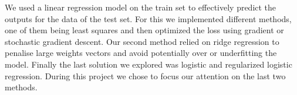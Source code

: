 \documentclass[10pt,conference,compsocconf]{IEEEtran}
\begin{document}
We used a linear regression model on the train set to effectively 
predict the outputs for the data of the test set. For this we implemented 
different methods, one of them being least squares and then optimized the 
loss using gradient or stochastic gradient descent.
Our second method relied on ridge regression to penalise large weights 
vectors and avoid potentially over or underfitting the model.
Finally the last solution we explored was logistic and regularized 
logistic regression. During this project we chose to focus our attention on
the last two methods.

\begin{table}[ht]
\centering
{}
\caption{Parameters, F1-score and accuracy results for the initial implementation
using the entire data-set.}
\label{tab:baseline}
\end{table}
\end{document}
